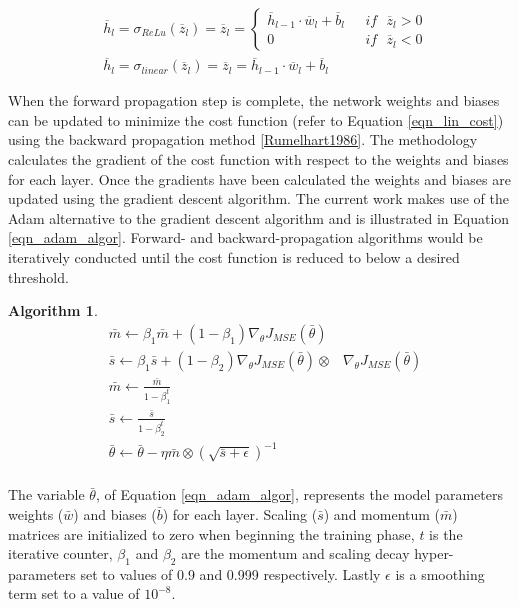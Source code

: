 \documentclass[a4paper,fleqn]{cas-sc}
\newtheorem{theorem}{Algorithm}
\begin{document}
\begin{equation}\label{eqn_act_func}
\begin{split}
&\overline{h}_l=\sigma_{ReLu}(\overline{z}_l) = \overline{z}_l =  
	\begin{cases}
	 \overline{h}_{l-1}\cdot\overline{w}_l+\overline{b}_l\,\,\,\, &if\,\,\,\, \overline{z}_l>0\\
	 0\,\,\,\, &if\,\,\,\, \overline{z}_l<0
	\end{cases}\\
&\overline{h}_l=\sigma_{linear}(\overline{z}_l) = \overline{z}_l = \overline{h}_{l-1}\cdot\overline{w}_l+\overline{b}_l
\end{split}
\end{equation}

When the forward propagation step is complete, the network weights and biases can be updated to minimize the cost function (refer to Equation \ref{eqn_lin_cost})  using the backward propagation method \ref{Rumelhart1986}. The methodology calculates the gradient of the cost function with respect to the weights and biases for each layer. Once the gradients have been calculated the weights and biases are updated using the gradient descent algorithm. The current work makes use of the Adam \cite{goodfellow} alternative to the gradient descent algorithm and is illustrated in Equation \ref{eqn_adam_algor}. Forward- and backward-propagation algorithms would be iteratively conducted until the cost function is reduced to below a desired threshold.

\begin{theorem} 
\begin{equation}\label{eqn_adam_algor} 
\begin{split}
&\bar{m}\leftarrow \beta_1\bar{m}+(1-\beta_1)\nabla_{\theta}J_{MSE}(\bar{\theta})\\
&\bar{s}\leftarrow \beta_1\bar{s}+(1-\beta_2)\nabla_{\theta}J_{MSE}(\bar{\theta})\otimes&\nabla_{\theta}J_{MSE}(\bar{\theta})\\
&\bar{m}\leftarrow\frac{\bar{m}}{1-\beta_1^t} \\
&\bar{s}\leftarrow\frac{\bar{s}}{1-\beta_2^t}\\
&\bar{\theta}\leftarrow\bar{\theta}-\eta\bar{m}\otimes(\sqrt{\bar{s}+\epsilon})^{-1}\\
\end{split}
\end{equation}
\end{theorem}

The variable $\bar{\theta}$, of Equation \ref{eqn_adam_algor}, represents the model parameters weights ($\bar{w}$) and biases ($\bar{b}$) for each layer. Scaling ($\bar{s}$) and momentum ($\bar{m}$) matrices are initialized to zero when beginning the training phase, $t$ is the iterative counter, $\beta_1$ and $\beta_2$ are the momentum and scaling decay hyper-parameters set to values of 0.9 and 0.999 respectively. Lastly $\epsilon$ is a smoothing term set to a value of $10^{-8}$.
\end{document}

